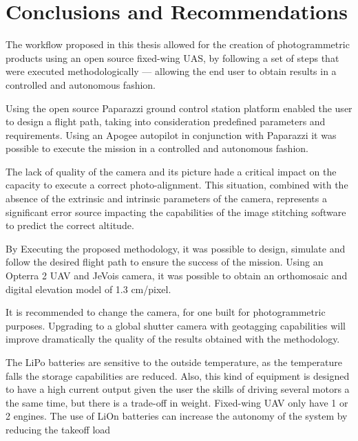 \section{Conclusions and Recommendations}
The workflow proposed in this thesis allowed for the creation of photogrammetric products using an open source fixed-wing UAS, by following a set of steps that were executed methodologically — allowing the end user to obtain results in a controlled and autonomous fashion.

Using the open source Paparazzi ground control station platform enabled the user to design a flight path, taking into consideration predefined parameters and requirements. Using an Apogee autopilot in conjunction with Paparazzi it was possible to execute the mission in a controlled and autonomous fashion.

The lack of quality of the camera and its picture hade a critical impact on the capacity to execute a correct photo-alignment. This situation, combined with the absence of the extrinsic and intrinsic parameters of the camera, represents a significant error source impacting the capabilities of the image stitching software to predict the correct altitude.

 By  Executing the proposed methodology, it was possible to design, simulate and follow the desired flight path to ensure the success of the mission.  Using an Opterra 2 UAV and JeVois camera, it was possible to obtain an orthomosaic and digital elevation model of 1.3 cm/pixel.
 

It is recommended to change the camera, for one built for photogrammetric purposes. Upgrading to a global shutter camera with geotagging capabilities will improve dramatically the quality of the results obtained with the methodology.

The LiPo batteries are sensitive to the outside temperature, as the temperature falls the storage capabilities are reduced. Also, this kind of equipment is designed to have a high current output given the user the skills of driving several motors a the same time, but there is a trade-off in weight. Fixed-wing UAV only have 1 or 2 engines. The use of LiOn batteries can increase the autonomy of the system by reducing the takeoff load